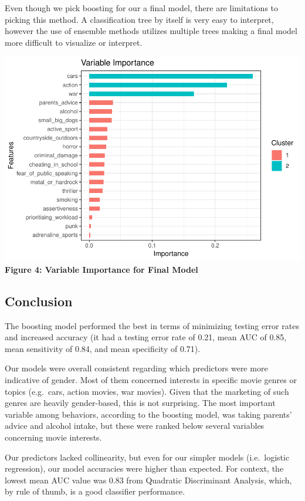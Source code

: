 \documentclass[]{article}
\begin{document}
Even though we pick boosting for our a final model, there are
limitations to picking this method. A classification tree by itself is
very easy to interpret, however the use of ensemble methods utilizes
multiple trees making a final model more difficult to visualize or
interpret.

\includegraphics{final_report_files/figure-latex/unnamed-chunk-14-1.pdf}
\textbf{Figure 4: Variable Importance for Final Model}

\subsection{Conclusion}\label{conclusion}

The boosting model performed the best in terms of minimizing testing
error rates and increased accuracy (it had a testing error rate of 0.21,
mean AUC of 0.85, mean sensitivity of 0.84, and mean specificity of
0.71).

Our models were overall consistent regarding which predictors were more
indicative of gender. Most of them concerned interests in specific movie
genres or topics (e.g.~cars, action movies, war movies). Given that the
marketing of such genres are heavily gender-based, this is not
surprising. The most important variable among behaviors, according to
the boosting model, was taking parents' advice and alcohol intake, but
these were ranked below several variables concerning movie interests.

Our predictors lacked collinearity, but even for our simpler models
(i.e.~logistic regression), our model accuracies were higher than
expected. For context, the lowest mean AUC value was 0.83 from Quadratic
Discriminant Analysis, which, by rule of thumb, is a good classifier
performance.
\end{document}
